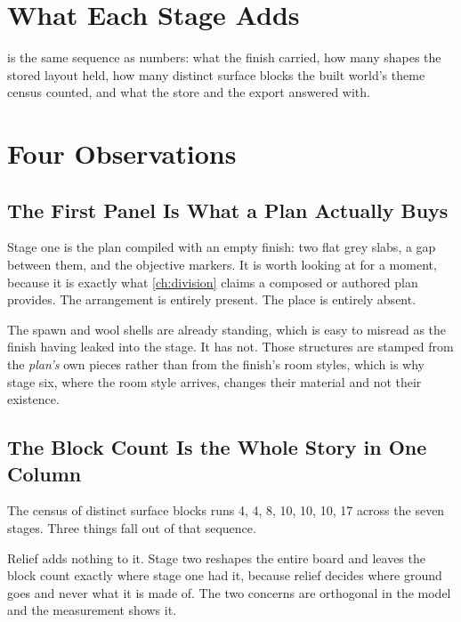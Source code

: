 \section{What Each Stage Adds}

 is the same sequence as numbers: what the finish carried, how many
shapes the stored layout held, how many distinct surface blocks the built world's
theme census counted, and what the store and the export answered with.

\begin{table}[htbp]
\caption{The seven stages, measured. The key added at each stage is bold; the rest
is inherited.}
\label{tab:stages}
\scriptsize

\end{table}

\section{Four Observations}

\subsection{The First Panel Is What a Plan Actually Buys}

Stage one is the plan compiled with an empty finish: two flat grey slabs, a gap
between them, and the objective markers. It is worth looking at for a moment,
because it is exactly what \cref{ch:division} claims a composed or authored plan
provides. The arrangement is entirely present. The place is entirely absent.

The spawn and wool shells are already standing, which is easy to misread as the
finish having leaked into the stage. It has not. Those structures are stamped from
the \emph{plan's} own pieces rather than from the finish's room styles, which is
why stage six, where the room style arrives, changes their material and not their
existence.

\subsection{The Block Count Is the Whole Story in One Column}

The census of distinct surface blocks runs 4, 4, 8, 10, 10, 10, 17 across the seven
stages. Three things fall out of that sequence.

Relief adds nothing to it. Stage two reshapes the entire board and leaves the block
count exactly where stage one had it, because relief decides where ground goes and
never what it is made of. The two concerns are orthogonal in the model and the
measurement shows it.


